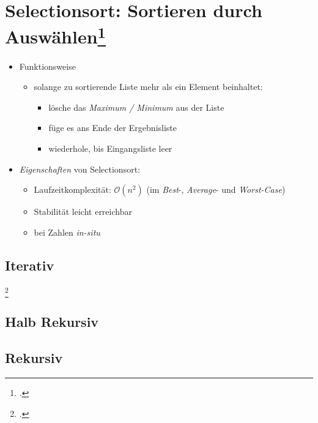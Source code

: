 \documentclass{lehramt-informatik-haupt}
\begin{document}

\chapter{Selectionsort: Sortieren durch Auswählen\footcite[Seite 39]{aud:fs:tafeluebung-11}}

\begin{quellen}
\item \cite[Seite 39]{aud:fs:tafeluebung-11}
\item \cite{wiki:selectionsort}
\item \cite[Seite 127-129 (PDF 145-147)]{saake}
\item \cite[6.4.1 Naive Sortierverfahren, Seite 191]{schneider}
\end{quellen}

\begin{itemize}
\item Funktionsweise

\begin{itemize}
\item solange zu sortierende Liste mehr als ein Element beinhaltet:

\begin{itemize}
\item lösche das \emph{Maximum / Minimum} aus der Liste
\item füge es ans Ende der Ergebnisliste
\item wiederhole, bis Eingangsliste leer
\end{itemize}

\end{itemize}

\item \emph{Eigenschaften} von Selectionsort:

\begin{itemize}
\item Laufzeitkomplexität:
$\mathcal{O}(n^2)$ (im \emph{Best}-, \emph{Average}- und
\emph{Worst-Case})

\item Stabilität leicht erreichbar
\item bei Zahlen \emph{in-situ}
\end{itemize}

\end{itemize}

%

\section{Iterativ}

\footcite[Seite 128 (PDF 146)]{saake}

\section{Halb Rekursiv}


\section{Rekursiv}


\literatur
\end{document}

